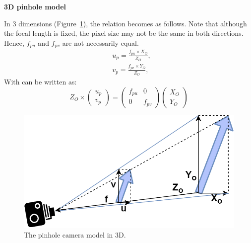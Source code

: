 \FloatBarrier
\noindent\textbf{3D pinhole model}

In 3 dimensions (Figure~\ref{fig_camera3d}), the relation becomes as follows. Note that although the focal length is fixed, the pixel size may not be the same in both directions. Hence, \(f_{pu}\) and \(f_{pv}\) are not necessarily equal.
\begin{equation}
  \begin{aligned}
  &u_p=\frac{f_{pu}\times X_O}{Z_O},\\
  &v_p=\frac{f_{pv}\times Y_O}{Z_O},
  \end{aligned}
\end{equation}
With can be written as:
\begin{equation}
  Z_O \times \begin{pmatrix}u_p\\v_p\end{pmatrix} = \begin{pmatrix}f_{pu} & 0 \\0 & f_{pv}\end{pmatrix}\begin{pmatrix}X_O\\Y_O\end{pmatrix}
\end{equation}

\begin{figure}[hbtp]
	\centering
	\def\svgwidth{\columnwidth}
	\fontsize{10pt}{10pt}\selectfont
	\includegraphics[width=0.5\linewidth]{"../Chap2/Figures/Camera_3D.png"}
	\caption{The pinhole camera model in 3D.} 
	\label{fig_camera3d}
\end{figure}

